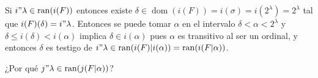 \documentclass{article}
\DeclareMathOperator{\ran}{ran}
\DeclareMathOperator{\dom}{dom}
\begin{document}
    \noindent\fontsize{16}{25}\selectfont
    Si $i"\lambda\in\ran(i(F))$ entonces existe
    $\delta\in\dom(i(F)) = i(\sigma) = i(2^\lambda) = 2^\lambda$
    tal que $i(F)(\delta) = i"\lambda$. Entonces se puede tomar
    $\alpha$ en el intervalo
    $\delta< \alpha < 2^\lambda$ y $\delta\leq i(\delta)< i(\alpha)$
    implica $\delta\in i(\alpha)$ pues $\alpha$ es transitivo al ser un ordinal,
    y entonces $\delta$ es testigo de
    $i"\lambda\in\ran(i(F)|i(\alpha)) = \ran(i(F|\alpha))$.

    ¿Por qué $j"\lambda\in\ran(j(F|\alpha))$?
\end{document}
